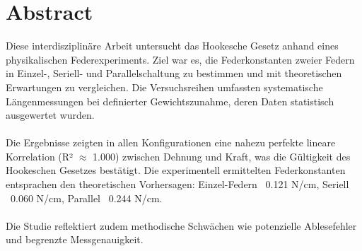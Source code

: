 \documentclass[../main.tex]{subfiles} %
\begin{document}
    \section{Abstract}\label{sec:abstract}
        Diese interdisziplinäre Arbeit untersucht das Hookesche Gesetz anhand eines physikalischen Federexperiments.
        Ziel war es, die Federkonstanten zweier Federn in Einzel-, Seriell- und Parallelschaltung zu bestimmen und mit theoretischen Erwartungen zu vergleichen.
        Die Versuchsreihen umfassten systematische Längenmessungen bei definierter Gewichtszunahme, deren Daten statistisch ausgewertet wurden.
        \\
        \\
        Die Ergebnisse zeigten in allen Konfigurationen eine nahezu perfekte lineare Korrelation (R² $\approx$ 1.000) zwischen Dehnung und Kraft, was die Gültigkeit des Hookeschen Gesetzes bestätigt.
        Die experimentell ermittelten Federkonstanten entsprachen den theoretischen Vorhersagen: Einzel-Federn ~0.121 N/cm, Seriell ~0.060 N/cm, Parallel ~0.244 N/cm.
        \\
        \\
        Die Studie reflektiert zudem methodische Schwächen wie potenzielle Ablesefehler und begrenzte Messgenauigkeit.
\end{document}
